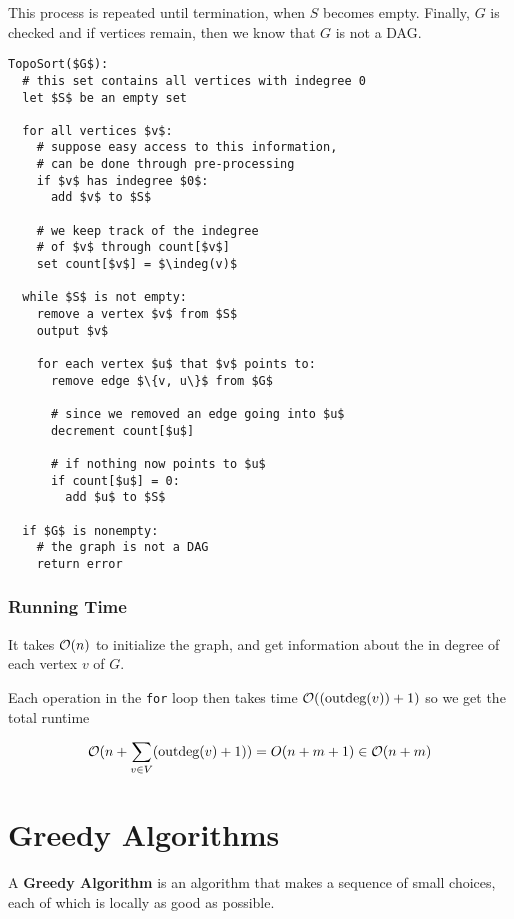 \documentclass[12pt]{article}
\begin{document}
  This process is repeated until termination, when $S$ becomes empty. Finally,
  $G$ is checked and if vertices remain, then we know that $G$ is not a DAG.

  \begin{lstlisting}
TopoSort($G$):
  # this set contains all vertices with indegree 0
  let $S$ be an empty set

  for all vertices $v$:
    # suppose easy access to this information,
    # can be done through pre-processing
    if $v$ has indegree $0$:
      add $v$ to $S$

    # we keep track of the indegree
    # of $v$ through count[$v$]
    set count[$v$] = $\indeg(v)$

  while $S$ is not empty:
    remove a vertex $v$ from $S$
    output $v$

    for each vertex $u$ that $v$ points to:
      remove edge $\{v, u\}$ from $G$

      # since we removed an edge going into $u$
      decrement count[$u$]

      # if nothing now points to $u$
      if count[$u$] = 0:
        add $u$ to $S$

  if $G$ is nonempty:
    # the graph is not a DAG
    return error
  \end{lstlisting}

  \subsubsection{Running Time}

  It takes $\mathcal O(n)$ to initialize the graph, and get information about the
  in degree of each vertex $v$ of $G$.

  Each operation in the \texttt{for} loop then takes time $\mathcal O((\text{outdeg}(v)) + 1)$
  so we get the total runtime

  \[
    \mathcal O(n + \sum_{v \in V} (\text{outdeg}(v) + 1)) = O(n + m + 1) \in \mathcal O(n + m)
  \]






  \newpage

  \section{Greedy Algorithms}

   {
    A {\bf Greedy Algorithm} is an algorithm that makes a sequence of small
    choices, each of which is locally as good as possible. 
  }
\end{document}
